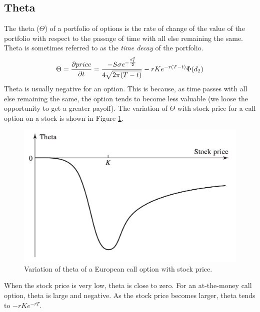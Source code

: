 \subsection{Theta}
The theta ($\Theta$) of a portfolio of options is the rate of change of the value of the portfolio with respect to the passage of time with all else remaining the same. Theta is sometimes referred to as the \emph{time decay} of the portfolio. 
\begin{equation}
    \Theta = \pdv{price}{t} = \dfrac{-S\sigma e^{-\frac{d_1^2}{2}}}{4\sqrt{2\pi(T-t)}}-rKe^{-r(T-t)}\Phi(d_2)
\end{equation}
Theta is usually negative for an option. This is because, as time passes with all else remaining the same, the option tends to become less valuable (we loose the opportunity to get a greater payoff). The variation of $\Theta$ with stock price for a call option on a stock is shown in Figure \ref{fig:theta}.
\begin{figure}[htp]
    \centering
    \includegraphics[scale=0.2]{fig/tmp/fig16.png}
    \caption{Variation of theta of a European call option with stock price.}
    \label{fig:theta}
\end{figure}
\newline When the stock price is very low, theta is close to zero. For an at-the-money call option, theta is large and negative. As the stock price becomes larger, theta tends to $-rKe^{-rT}$.

